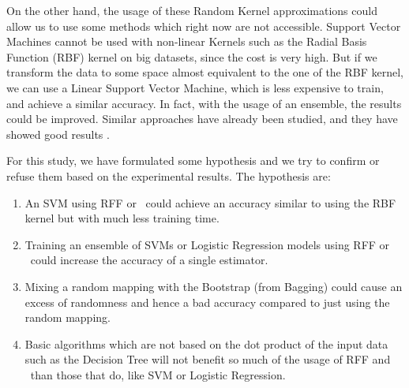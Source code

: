 \begin{pre-delivery}
  On the other hand, the usage of these Random Kernel approximations could
  allow us to use some methods which right now are not accessible. Support
  Vector Machines cannot be used with non-linear Kernels such as the Radial
  Basis Function (RBF) kernel on big datasets, since the cost is very high. But if
  we transform the data to some space almost equivalent to the one of the
  RBF kernel, we can use a Linear Support Vector Machine, which is less
  expensive to train, and achieve a similar accuracy. In fact, with the usage
  of an ensemble, the results could be improved. Similar approaches have
  already been studied, and they have showed good results \cite{svm_rff}
  \cite{Zhang2017StackedKN} \cite{rahimi2008random}.

  For this study, we have formulated some hypothesis and we try to confirm or
  refuse them based on the experimental results. The hypothesis are:
  \begin{enumerate}
    \item An SVM using RFF or \Nys\ could achieve an accuracy similar to
    using the RBF kernel but with much less training time.
    \item Training an ensemble of SVMs or Logistic Regression models using
    RFF or \Nys\ could increase the accuracy of a single estimator.
    \item Mixing a random mapping with the Bootstrap (from Bagging) could cause
    an excess of randomness and hence a bad accuracy compared to just using
    the random mapping.
    \item Basic algorithms which are not based on the dot product of the
    input data such as the Decision Tree will not benefit so much of the
    usage of RFF and \Nys\ than those that do, like SVM or
    Logistic Regression.
  \end{enumerate}


\end{pre-delivery}
